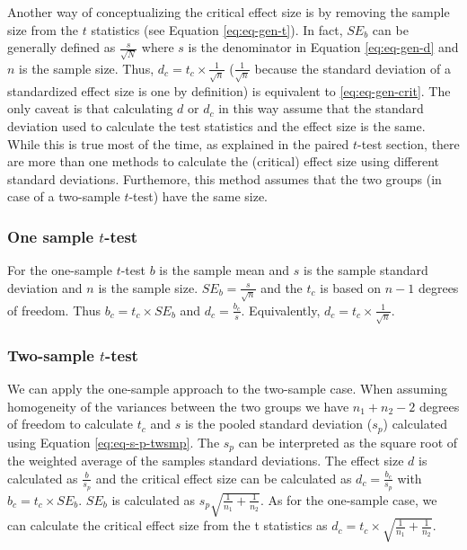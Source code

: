 \documentclass[
  man,floatsintext]{apa7}
\begin{document}
Another way of conceptualizing the critical effect size is by removing the sample size from the \(t\) statistics (see Equation \eqref{eq:eq-gen-t}). In fact, \(SE_b\) can be generally defined as \(\frac{s}{\sqrt{N}}\) where \(s\) is the denominator in Equation \eqref{eq:eq-gen-d} and \(n\) is the sample size. Thus, \(d_c = t_c \times \frac{1}{\sqrt{n}}\) (\(\frac{1}{\sqrt{n}}\) because the standard deviation of a standardized effect size is one by definition) is equivalent to \eqref{eq:eq-gen-crit}. The only caveat is that calculating \(d\) or \(d_c\) in this way assume that the standard deviation used to calculate the test statistics and the effect size is the same. While this is true most of the time, as explained in the paired \(t\)-test section, there are more than one methods to calculate the (critical) effect size using different standard deviations. Furthemore, this method assumes that the two groups (in case of a two-sample \(t\)-test) have the same size.

\subsubsection{\texorpdfstring{One sample \(t\)-test}{One sample t-test}}\label{one-sample-t-test}

For the one-sample \(t\)-test \(b\) is the sample mean and \(s\) is the sample standard deviation and \(n\) is the sample size. \(SE_b = \frac{s}{\sqrt{n}}\) and the \(t_c\) is based on \(n - 1\) degrees of freedom. Thus \(b_c = t_c \times SE_b\) and \(d_c = \frac{b_c}{s}\). Equivalently, \(d_c = t_c \times \frac{1}{\sqrt{n}}\).

\subsubsection{\texorpdfstring{Two-sample \(t\)-test}{Two-sample t-test}}\label{two-sample-t-test}

We can apply the one-sample approach to the two-sample case. When assuming homogeneity of the variances between the two groups we have \(n_1 + n_2 - 2\) degrees of freedom to calculate \(t_c\) and \(s\) is the pooled standard deviation (\(s_p\)) calculated using Equation \eqref{eq:eq-s-p-twsmp}. The \(s_p\) can be interpreted as the square root of the weighted average of the samples standard deviations. The effect size \(d\) is calculated as \(\frac{b}{s_p}\) and the critical effect size can be calculated as \(d_c = \frac{b_c}{s_p}\) with \(b_c = t_c \times SE_b\). \(SE_b\) is calculated as \(s_p \sqrt{\frac{1}{n_1} + \frac{1}{n_2}}\). As for the one-sample case, we can calculate the critical effect size from the t statistics as \(d_c = t_c \times \sqrt{\frac{1}{n_1} + \frac{1}{n_2}}\).
\end{document}
